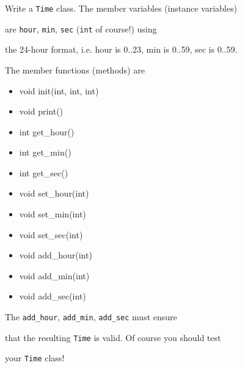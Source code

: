 Write a \texttt{Time} class. The member variables (instance variables)

are \texttt{hour}, \texttt{min}, \texttt{sec} (\texttt{int} of course!) using

the 24-hour format, i.e. hour is 0..23, min is 0..59, sec is 0..59.

The member functions (methods) are



\begin{itemize}

\item void init(int, int, int)

\item void print()

\item int get\_hour()

\item int get\_min()

\item int get\_sec()

\item void set\_hour(int)

\item void set\_min(int)

\item void set\_sec(int)

\item void add\_hour(int)

\item void add\_min(int)

\item void add\_sec(int)

\end{itemize}



The \texttt{add\_hour}, \texttt{add\_min}, \texttt{add\_sec} must ensure

that the resulting \texttt{Time} is valid. Of course you should test

your \texttt{Time} class!

